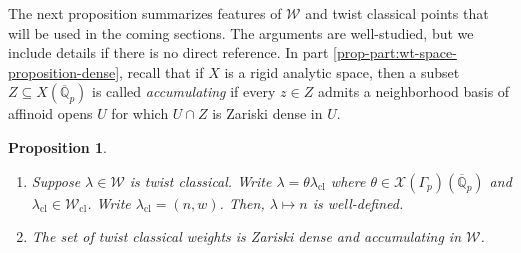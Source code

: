 \documentclass[10pt, twoside]{amsart}
\theoremstyle{plain}
\newtheorem{proposition}[theorem]{Proposition}
\theoremstyle{definition}
\theoremstyle{remark}
\numberwithin{equation}{subsection}
\def\scrw{\mathscr W}
\def\scrx{\mathscr X}
\def\cl{\mathrm{cl}}
\def\qpbar{\overline{\mathbb Q}_p}
\begin{document}
The next proposition summarizes features of $\scrw$ and twist classical points that will be used in the coming sections. The arguments are well-studied, but we include  details if there is no direct reference. In part \ref{prop-part:wt-space-proposition-dense}, recall that if $X$ is a rigid analytic space, then a subset $Z \subseteq X(\qpbar)$ is called \emph{accumulating} if every $z \in Z$ admits a neighborhood basis of affinoid opens $U$ for which $U\cap Z$ is Zariski dense in $U$. 

\begin{proposition}\label{prop:wt-space-proposition}
\leavevmode
\begin{enumerate}[label=(\roman*)]
\item Suppose $\lambda \in \scrw$ is twist classical. Write $\lambda = \theta \lambda_{\cl}$ where $\theta \in \scrx(\Gamma_p)(\qpbar)$ and $\lambda_{\cl} \in \scrw_{\cl}$. Write $\lambda_{\cl} = (n,w)$. Then, $\lambda \mapsto n$ is well-defined.\label{prop-part:wt-space-proposition-independent}
\item The set of twist classical weights is Zariski dense and accumulating in $\scrw$. \label{prop-part:wt-space-proposition-dense}
\end{enumerate}
\end{proposition}
\end{document}
